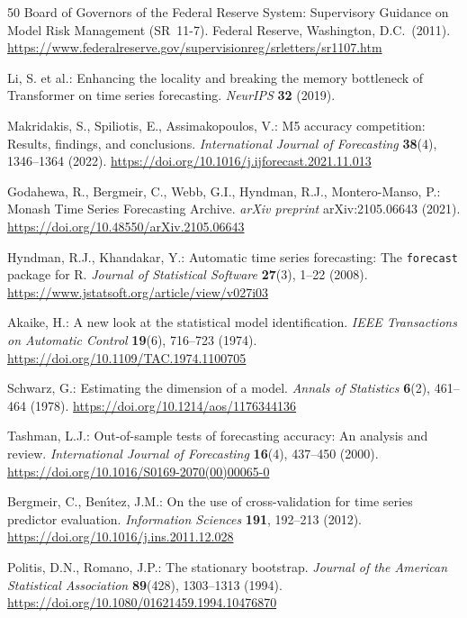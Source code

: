 \documentclass[sn-mathphys-num,pdflatex]{sn-jnl}
\begin{document}
\begin{thebibliography}{50}
Board of Governors of the Federal Reserve System:
Supervisory Guidance on Model Risk Management (SR~11-7).
Federal Reserve, Washington, D.C.\ (2011).
\url{https://www.federalreserve.gov/supervisionreg/srletters/sr1107.htm}

Li, S. et al.:
Enhancing the locality and breaking the memory bottleneck of Transformer
on time series forecasting.
\textit{NeurIPS} \textbf{32} (2019).


Makridakis, S., Spiliotis, E., Assimakopoulos, V.:
M5 accuracy competition: Results, findings, and conclusions.
\textit{International Journal of Forecasting} \textbf{38}(4), 1346--1364 (2022).
\url{https://doi.org/10.1016/j.ijforecast.2021.11.013}

Godahewa, R., Bergmeir, C., Webb, G.I., Hyndman, R.J., Montero-Manso, P.:
Monash Time Series Forecasting Archive.
\textit{arXiv preprint} arXiv:2105.06643 (2021).
\url{https://doi.org/10.48550/arXiv.2105.06643}

Hyndman, R.J., Khandakar, Y.:
Automatic time series forecasting: The \texttt{forecast} package for R.
\textit{Journal of Statistical Software} \textbf{27}(3), 1--22 (2008).
\url{https://www.jstatsoft.org/article/view/v027i03}

Akaike, H.:
A new look at the statistical model identification.
\textit{IEEE Transactions on Automatic Control} \textbf{19}(6), 716--723 (1974).
\url{https://doi.org/10.1109/TAC.1974.1100705}

Schwarz, G.:
Estimating the dimension of a model.
\textit{Annals of Statistics} \textbf{6}(2), 461--464 (1978).
\url{https://doi.org/10.1214/aos/1176344136}

Tashman, L.J.:
Out-of-sample tests of forecasting accuracy: An analysis and review.
\textit{International Journal of Forecasting} \textbf{16}(4), 437--450 (2000).
\url{https://doi.org/10.1016/S0169-2070(00)00065-0}

Bergmeir, C., Ben\'{\i}tez, J.M.:
On the use of cross-validation for time series predictor evaluation.
\textit{Information Sciences} \textbf{191}, 192--213 (2012).
\url{https://doi.org/10.1016/j.ins.2011.12.028}

Politis, D.N., Romano, J.P.:
The stationary bootstrap.
\textit{Journal of the American Statistical Association} \textbf{89}(428), 1303--1313 (1994).
\url{https://doi.org/10.1080/01621459.1994.10476870}


\end{thebibliography}
\end{document}
